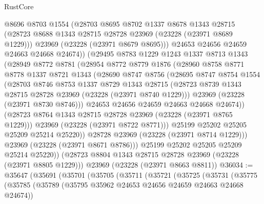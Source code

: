 \begin{lexlean}{RustCore}
\begin{coremodule}
              @8696
              @8703
              @1554
              (@28703
                @8695
                @8702
                @1337
                @8678
                @1343
                @28715
                (@28723 @8688 @1343 @28715 @28728 @23969 (@23228 (@23971 @8689 @1229)))
                @23969
                (@23228 (@23971 @8679 @8695)))
              @24653
              @24656
              @24659
              @24663
              @24668
              @24674))
          (@29495
            @8783
            @1229
            @1243
            @1337
            @8713
            @1343
            (@28949
              @8772
              @8781
              (@28954
                @8772
                @8779
                @1876
                (@28960
                  @8758
                  @8771
                  @8778
                  @1337
                  @8721
                  @1343
                  (@28690
                    @8747
                    @8756
                    (@28695
                      @8747
                      @8754
                      @1554
                      (@28703
                        @8746
                        @8753
                        @1337
                        @8729
                        @1343
                        @28715
                        (@28723 @8739 @1343 @28715 @28728 @23969 (@23228 (@23971 @8740 @1229)))
                        @23969
                        (@23228 (@23971 @8730 @8746)))
                      @24653
                      @24656
                      @24659
                      @24663
                      @24668
                      @24674))
                  (@28723 @8764 @1343 @28715 @28728 @23969 (@23228 (@23971 @8765 @1229)))
                  @23969
                  (@23228 (@23971 @8722 @8771)))
                @25199
                @25202
                @25205
                @25209
                @25214
                @25220))
            @28728
            @23969
            (@23228 (@23971 @8714 @1229)))
          @23969
          (@23228 (@23971 @8671 @8786)))
        @25199
        @25202
        @25205
        @25209
        @25214
        @25220))
    (@28723 @8804 @1343 @28715 @28728 @23969 (@23228 (@23971 @8805 @1229)))
    @23969
    (@23228 (@23971 @8663 @8811))
@36034 := @35647
    (@35691
      (@35701
        (@35705
          (@35711
            (@35721
              (@35725
                (@35731
                  (@35775
                    (@35785
                      (@35789 (@35795 @35962 @24653 @24656 @24659 @24663 @24668 @24674))

\end{coremodule}
\end{lexlean}
